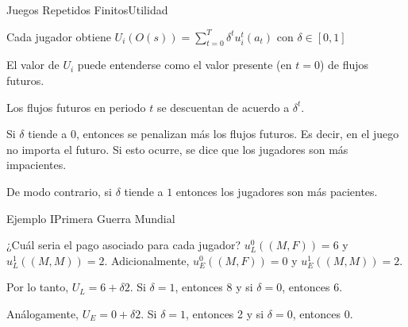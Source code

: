 \documentclass[notes, 11pt]{beamer} %
\newenvironment{wideitemize}{\itemize\addtolength{\itemsep}{10pt}}{\enditemize}
\begin{document}
\begin{frame}{Juegos Repetidos Finitos}{Utilidad}
	\begin{wideitemize}
		\item<1-> Cada jugador obtiene $U_{i}( O(s) ) = \sum_{t=0}^{T} \delta^{t} u_{i}^{t}( a_{t} )  $ con $\delta \in [0,1]$
		\item<2-> El valor de $U_{i}$ puede entenderse como el valor presente (en $t=0$) de flujos futuros.
		\item<3-> Los flujos futuros en periodo $t$ se descuentan de acuerdo a $\delta^{t}$.
		\item<4-> Si $\delta$ tiende a $0$, entonces se penalizan m\'as los flujos futuros. Es decir, en el juego no importa el futuro. Si esto ocurre, se dice que los jugadores son m\'as impacientes.
		\item<5-> De modo contrario, si $\delta$ tiende a $1$ entonces los jugadores son m\'as pacientes.
	\end{wideitemize}
\end{frame}

\begin{frame}{Ejemplo I}{Primera Guerra Mundial}
	\begin{wideitemize}
		\item<1-> ¿Cu\'al seria el pago asociado para cada jugador? $u_{L}^{0}((M,F))= 6$ y $u_{L}^{1}((M,M))= 2 $. Adicionalmente, $u_{E}^{0}((M,F))= 0$ y $u_{E}^{1}((M,M))= 2 $. 
		\item<2-> Por lo tanto, $U_{L} = 6 + \delta 2$. Si $\delta = 1$, entonces 8 y si $\delta=0$, entonces 6.
		\item<3-> An\'alogamente, $U_{E} = 0 + \delta 2$. Si $\delta = 1$, entonces 2 y si $\delta=0$, entonces 0.
	\end{wideitemize}
\end{frame}
\end{document}

